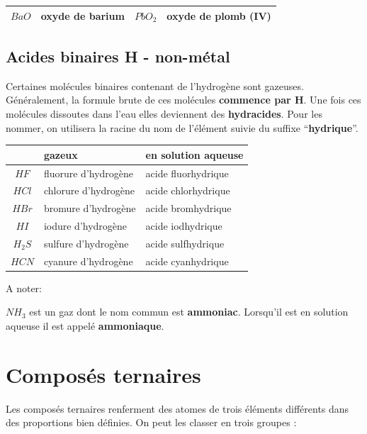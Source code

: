 \documentclass[
  11pt,
  a4paper,
  openany]{book}
\begin{document}
\begin{longtable}[]{@{}clcl@{}}
\toprule()
\endhead
\(BaO\) & \textbf{oxyde} de barium & \(PbO_2\) & \textbf{oxyde} de plomb \textbf{(IV)} \\
\bottomrule()
\end{longtable}

\hypertarget{acides-binaires-h---non-muxe9tal}{%
\subsection{Acides binaires \textbar{} H - non-métal}\label{acides-binaires-h---non-muxe9tal}}

Certaines molécules binaires contenant de l'hydrogène sont gazeuses. Généralement, la formule brute de ces molécules \textbf{commence par H}. Une fois ces molécules dissoutes dans l'eau elles deviennent des \textbf{hydracides}. Pour les nommer, on utilisera la racine du nom de l'élément suivie du suffixe ``\textbf{hydrique}''.

\begin{longtable}[]{@{}cll@{}}
\toprule()
& gazeux & en solution aqueuse \\
\midrule()
\endhead
\(HF\) & fluorure d'hydrogène & acide fluorhydrique \\
\(HCl\) & chlorure d'hydrogène & acide chlorhydrique \\
\(HBr\) & bromure d'hydrogène & acide bromhydrique \\
\(HI\) & iodure d'hydrogène & acide iodhydrique \\
\(H_2S\) & sulfure d'hydrogène & acide sulfhydrique \\
\(HCN\) & cyanure d'hydrogène & acide cyanhydrique \\
\bottomrule()
\end{longtable}

A noter:

\(NH_3\) est un gaz dont le nom commun est \textbf{ammoniac}. Lorsqu'il est en solution aqueuse il est appelé \textbf{ammoniaque}.

\hypertarget{composuxe9s-ternaires}{%
\section{Composés ternaires}\label{composuxe9s-ternaires}}

Les composés ternaires renferment des atomes de trois éléments différents dans des proportions bien définies. On peut les classer en trois groupes :
\end{document}
